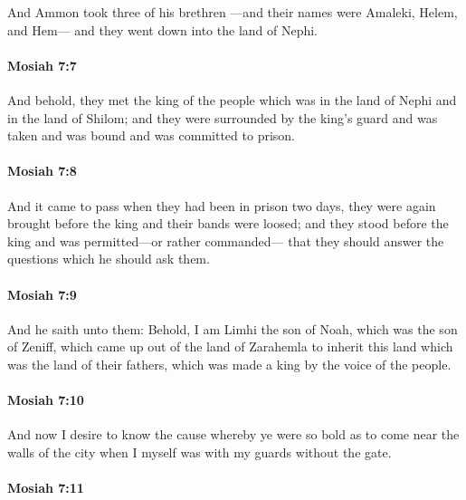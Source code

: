 			And Ammon took three of his brethren
			---and their names were Amaleki, Helem, and Hem---
			and they went down into the land of Nephi.

		\paragraph{Mosiah 7:7} %
			\label{MOSIAH-7-7}

			And behold, they met the king of the people
			which was in the land of Nephi and in the land of Shilom;
			and they were surrounded by the king's guard
			and was taken and was bound and was committed to prison.

		\paragraph{Mosiah 7:8} %
			\label{MOSIAH-7-8}

			And it came to pass when they had been in prison two days,
			they were again brought before the king
			and their bands were loosed;
			and they stood before the king
			and was permitted---or rather commanded---
			that they should answer the questions which he should ask them.

		\paragraph{Mosiah 7:9} %
			\label{MOSIAH-7-9}

			And he saith unto them:
			Behold, I am Limhi the son of Noah, which was the son of Zeniff,
			which came up out of the land of Zarahemla
			to inherit this land which was the land of their fathers,
			which was made a king by the voice of the people.

		\paragraph{Mosiah 7:10} %
			\label{MOSIAH-7-10}

			And now I desire to know the cause whereby ye were so bold
			as to come near the walls of the city
			when I myself was with my guards without the gate.

		\paragraph{Mosiah 7:11} %
			\label{MOSIAH-7-11}

